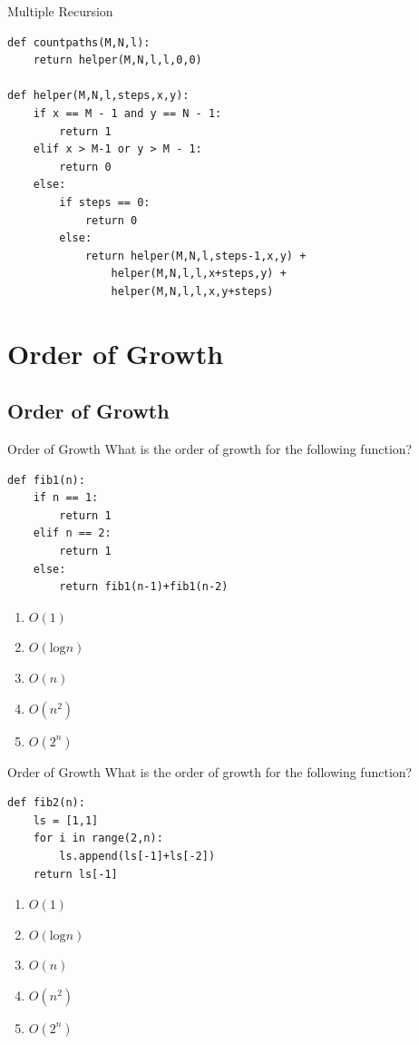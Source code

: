 \documentclass[9pt]{beamer}
\begin{document}
\begin{frame}[fragile]{Multiple Recursion}

  \begin{lstlisting}
def countpaths(M,N,l):
    return helper(M,N,l,l,0,0)

def helper(M,N,l,steps,x,y):
    if x == M - 1 and y == N - 1:
        return 1
    elif x > M-1 or y > M - 1:
        return 0
    else:
        if steps == 0:
            return 0
        else:
            return helper(M,N,l,steps-1,x,y) +
                helper(M,N,l,l,x+steps,y) +
                helper(M,N,l,l,x,y+steps)
  \end{lstlisting}
\end{frame}

\section{Order of Growth}
\subsection{Order of Growth}
\begin{frame}[fragile]{Order of Growth}
  What is the order of growth for the following function?

  \begin{lstlisting}
def fib1(n):
    if n == 1:
        return 1
    elif n == 2:
        return 1
    else:
        return fib1(n-1)+fib1(n-2)
  \end{lstlisting}

  \begin{enumerate}
    \item
      $O(1)$
    \item
      $O(\text{log}n)$
    \item
      $O(n)$
    \item
      $O(n^2)$
    \item
      \alert<2>{$O(2^n)$}
  \end{enumerate}
\end{frame}

\begin{frame}[fragile]{Order of Growth}
  What is the order of growth for the following function?

  \begin{lstlisting}
def fib2(n):
    ls = [1,1]
    for i in range(2,n):
        ls.append(ls[-1]+ls[-2])
    return ls[-1]
  \end{lstlisting}

  \begin{enumerate}
    \item
      $O(1)$
    \item
      $O(\text{log}n)$
    \item
      \alert<2>{$O(n)$}
    \item
      $O(n^2)$
    \item
      $O(2^n)$
  \end{enumerate}
\end{frame}
\end{document}
